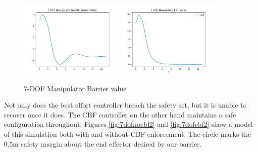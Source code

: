 \begin{figure}[H]
    \centering
    \includegraphics[width=0.45\textwidth]{Figures/Examples/7DOF/7DOFNoCBFValue.png}
    \includegraphics[width=0.45\textwidth]{Figures/Examples/7DOF/7DOFCBFValue.png}
    \caption{7-DOF Manipulator Barrier value}
    \label{fig:7dofbarriervalue2}
\end{figure}

\noindent Not only does the best effort controller breach the safety set, but it is unable to recover once it does. The CBF controller on the other hand maintains a safe configuration throughout. Figures \ref{fig:7dofnocbf2} and \ref{fig:7dofcbf2} show a model of this simulation both with and without CBF enforcement. The circle marks the 0.5m safety margin about the end effector desired by our barrier.

